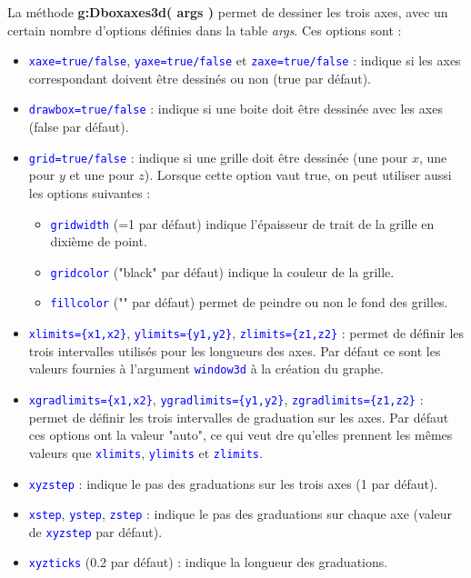 La méthode \textbf{g:Dboxaxes3d( args )} permet de dessiner les trois axes, avec un certain nombre d'options définies dans la table \emph{args}. Ces options sont :
\def\opt#1{\textcolor{blue}{\texttt{#1}}}%
\begin{itemize}
    \item \opt{xaxe=true/false}, \opt{yaxe=true/false} et \opt{zaxe=true/false} : indique si les axes correspondant doivent être dessinés ou non (true par défaut).

    \item \opt{drawbox=true/false} : indique si une boite doit être dessinée avec les axes (false par défaut).

    \item \opt{grid=true/false} : indique si une grille doit être dessinée (une pour $x$, une pour $y$ et une pour $z$). Lorsque cette option vaut true, on peut utiliser aussi les options suivantes :
        \begin{itemize}
            \item \opt{gridwidth} (=1 par défaut) indique l'épaisseur de trait de la grille en dixième de point.
            \item \opt{gridcolor} ("black" par défaut) indique la couleur de la grille.
            \item \opt{fillcolor} ("" par défaut) permet de peindre ou non le fond des grilles.
        \end{itemize}
    
    \item \opt{xlimits=\{x1,x2\}}, \opt{ylimits=\{y1,y2\}}, \opt{zlimits=\{z1,z2\}} : permet de définir les trois intervalles utilisés pour les longueurs des axes. Par défaut ce sont les valeurs fournies à l'argument \opt{window3d} à la création du graphe.

    \item \opt{xgradlimits=\{x1,x2\}}, \opt{ygradlimits=\{y1,y2\}}, \opt{zgradlimits=\{z1,z2\}} : permet de définir les trois intervalles de graduation sur les axes. Par défaut ces options ont la valeur "auto", ce qui veut dre qu'elles prennent les mêmes valeurs que \opt{xlimits}, \opt{ylimits} et \opt{zlimits}.
    \item \opt{xyzstep} : indique le pas des graduations sur les trois axes (1 par défaut).
    \item \opt{xstep}, \opt{ystep}, \opt{zstep} : indique le pas des graduations sur chaque axe (valeur de \opt{xyzstep} par défaut).

    \item \opt{xyzticks} (0.2 par défaut) : indique la longueur des graduations.


\end{itemize}
